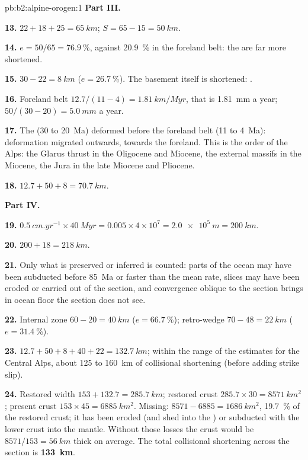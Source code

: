 \begin{solution}{pb:b2:alpine-orogen:1}
\noindent\textbf{Part III.}

\textbf{13.} $22 + 18 + 25 = \qty{65}{km}$; $S = 65 - 15 = \qty{50}{km}$.

\textbf{14.} $e = 50/65 = \qty{76.9}{\percent}$, against \qty{20.9}{\percent} in the
foreland belt: the  are far more shortened.

\textbf{15.} $30 - 22 = \qty{8}{km}$ ($e = \qty{26.7}{\percent}$). The basement itself is
shortened: .

\textbf{16.} Foreland belt $12.7/(11 - 4) = \qty{1.81}{km/Myr}$, that is
\qty{1.81}{mm} a year;  $50/(30 - 20) = \qty{5.0}{mm}$ a year.

\textbf{17.} The  (30 to \qty{20}{Ma}) deformed before the foreland belt (11 to
\qty{4}{Ma}): deformation migrated outwards, towards the foreland. This is the order of the
Alps: the Glarus thrust in the Oligocene and Miocene, the external massifs in the Miocene,
the Jura in the late Miocene and Pliocene.

\textbf{18.} $12.7 + 50 + 8 = \qty{70.7}{km}$.

\noindent\textbf{Part IV.}

\textbf{19.} $\qty{0.5}{cm.yr^{-1}}\times\qty{40}{Myr} = 0.005\times4\times10^7 =
\qty{2.0e5}{m} = \qty{200}{km}$.

\textbf{20.} $200 + 18 = \qty{218}{km}$.

\textbf{21.} Only what is preserved or inferred is counted: parts of the ocean may have
been subducted before \qty{85}{Ma} or faster than the mean rate,  slices may have
been eroded or carried out of the section, and convergence oblique to the section brings
in ocean floor the section does not see.

\textbf{22.} Internal zone $60 - 20 = \qty{40}{km}$ ($e = \qty{66.7}{\percent}$); retro-wedge
$70 - 48 = \qty{22}{km}$ ($e = \qty{31.4}{\percent}$).

\textbf{23.} $12.7 + 50 + 8 + 40 + 22 = \qty{132.7}{km}$; within the range of the estimates
for the Central Alps, about 125 to \qty{160}{km} of collisional shortening (before adding
strike slip).

\textbf{24.} Restored width $153 + 132.7 = \qty{285.7}{km}$; restored crust
$285.7\times30 = \qty{8571}{km^2}$; present crust $153\times45 = \qty{6885}{km^2}$. Missing:
$8571 - 6885 = \qty{1686}{km^2}$, \qty{19.7}{\percent} of the restored crust; it has been
eroded (and shed into the ) or subducted with the lower crust into the
mantle. Without those losses the crust would be $8571/153 = \qty{56}{km}$ thick on average.
The total collisional shortening across the section is
\textbf{\qty[text-series-to-math=true]{133}{km}}.
\end{solution}
